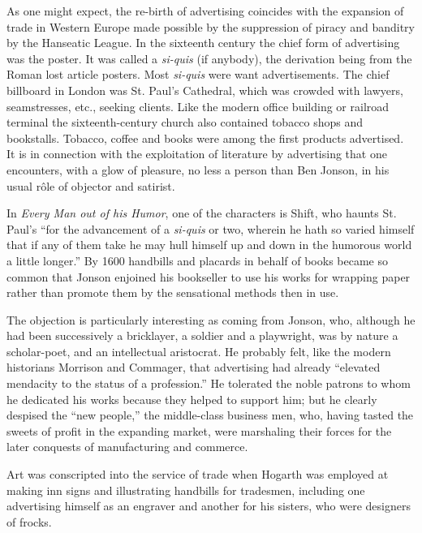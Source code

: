 \documentclass[twoside,nohyper,openany,nobib]{tufte-book}
\begin{document}
As one might expect, the re-birth of advertising coincides with the
expansion of trade in Western Europe made possible by the suppression of
piracy and banditry by the Hanseatic League. In the sixteenth century
the chief form of advertising was the poster. It was called a
\emph{si-quis} (if anybody), the derivation being from the Roman lost
article posters. Most \emph{si-quis} were want advertisements. The chief
billboard in London was St. Paul's Cathedral, which was crowded with
lawyers, seamstresses, etc., seeking clients. Like the modern office
building or railroad terminal the sixteenth-century church also
contained tobacco shops and bookstalls. Tobacco, coffee and books were
among the first products advertised. It is in connection with the
exploitation of literature by advertising that one encounters, with a
glow of pleasure, no less a person than Ben Jonson, in his usual r\^ole of
objector and satirist.

In \emph{Every Man out of his Humor}, one of the characters is Shift,
who haunts St. Paul's ``for the advancement of a \emph{si-quis} or two,
wherein he hath so varied himself that if any of them take he may hull
himself up and down in the humorous world a little longer.'' By 1600
handbills and placards in behalf of books became so common that Jonson
enjoined his bookseller to use his works for wrapping paper rather than
promote them by the sensational methods then in use.

The objection is particularly interesting as coming from Jonson, who,
although he had been successively a bricklayer, a soldier and a
playwright, was by nature a scholar-poet, and an intellectual
aristocrat. He probably felt, like the modern historians Morrison and
Commager, that advertising had already ``elevated mendacity to the
status of a profession.'' He tolerated the noble patrons to whom he
dedicated his works because they helped to support him; but he clearly
despised the ``new people,'' the middle-class business men, who, having
tasted the sweets of profit in the expanding market, were marshaling
their forces for the later conquests of manufacturing and commerce.

Art was conscripted into the service of trade when Hogarth was employed
at making inn signs and illustrating handbills for tradesmen, including
one advertising himself as an engraver and another for his sisters, who
were designers of frocks.
\end{document}
